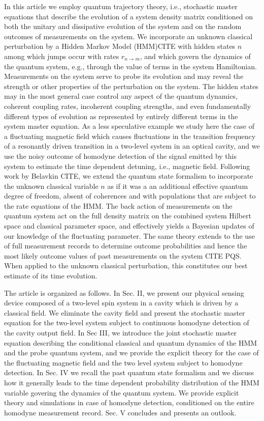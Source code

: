 \documentclass[aps,pra,twocolumn,groupedaddress,showpacs]{revtex4}
\begin{document}
In this article we employ quantum trajectory theory, i.e., stochastic master equations that describe the evolution of a system density matrix conditioned on both the unitary and dissipative evolution of the system and on the random outcomes of measurements on the system. We incorporate an unknown classical perturbation by a Hidden Markov Model (HMM)CITE  with hidden states $n$ among which jumps occur with rates $r_{n\rightarrow m}$, and which govern the dynamics of the quantum system, e.g., through the value of terms in the system Hamiltonian. Measurements on the system serve to probe its evolution and may reveal the strength or other properties of the perturbation on the system. The hidden states may in the most general case control any aspect of the quantum dynamics, coherent coupling rates, incoherent coupling strengths, and even fundamentally different types of evolution as represented by entirely different terms in the system master equation. As a less speculative  example we study here the case of a fluctuating magnetic field which causes fluctuations in the transition frequency of a resonantly driven transition in a two-level system in an optical cavity, and we use the noisy outcome of homodyne detection of the signal emitted by this system to estimate the time dependent detuning, i.e., magnetic field. Following work by Belavkin CITE, we extend the quantum state formalism to incorporate the unknown classical variable $n$ as if it was a an additional effective quantum degree of freedom, absent of coherences and with populations that are subject to the rate equations of the HMM. The back action of measurements on the quantum system act on the full density matrix on the combined system Hilbert space and classical parameter space, and effectively yields a Bayesian updates of our knowledge of the fluctuating parameter. The same theory extends to the use of full measurement records to determine outcome probabilities and hence the most likely outcome values of past measurements on the system CITE PQS. When applied to the unknown classical perturbation, this constitutes our best estimate of its time evolution.

The article is organized as follows. In Sec. II, we present our physical sensing device composed of a two-level spin system in a cavity which is driven by a classical field. We eliminate the cavity field and present the stochastic master equation for the two-level system subject to continuous homodyne detection of the cavity output field. In Sec III, we introduce the joint stochastic master equation describing the conditional classical and quantum dynamics of the HMM and the probe quantum system, and we provide the explicit theory for the case of the fluctuating magnetic field and the two level system subject to homodyne detection. In Sec. IV we recall the past quantum state formalism and we discuss how it generally leads to the time dependent probability distribution of the HMM variable govering the dynamics of the quantum system. We provide explicit theory and simulations in case of homodyne detection, conditioned on the entire homodyne measurement record.  Sec. V concludes and presents an outlook.
\end{document}
